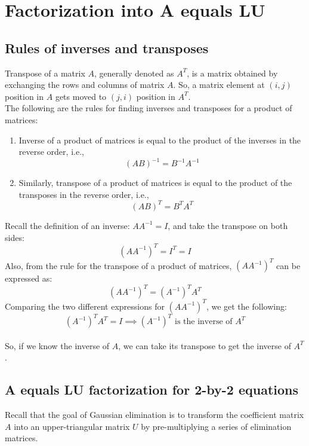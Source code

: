 \documentclass[../main.tex]{subfiles}
\begin{document}

\section{Factorization into A equals LU}


\subsection{Rules of inverses and transposes}
Transpose of a matrix $A$, generally denoted as $A^{T}$, is a matrix obtained by exchanging the rows and columns of matrix $A$. So, a matrix element at $(i, j)$ position in $A$ gets moved to $(j, i)$ position in $A^{T}$. \\

The following are the rules for finding inverses and transposes for a product of matrices:
\begin{enumerate}
    \item Inverse of a product of matrices is equal to the product of the inverses in the reverse order, i.e.,
          \[(AB)^{-1} = B^{-1}A^{-1}\]
    \item Similarly, transpose of a product of matrices is equal to the product of the transposes in the reverse order, i.e.,
          \[(AB)^{T} = B^{T}A^{T}\]
\end{enumerate}
Recall the definition of an inverse: $AA^{-1} = I$, and take the transpose on both sides:
\[
    (AA^{-1})^{T} = I^{T} = I
\]
Also, from the rule for the transpose of a product of matrices, $(AA^{-1})^{T}$ can be expressed as:
\[
    (AA^{-1})^{T} = (A^{-1})^{T}A^{T}
\]
Comparing the two different expressions for $(AA^{-1})^T$, we get the following:
\[
    (A^{-1})^{T}A^{T} = I \implies \text{$(A^{-1})^{T}$ is the inverse of $A^{T}$}
\]
\\
So, if we know the inverse of $A$, we can take its transpose to get the inverse of $A^{T}$.



\subsection{A equals LU factorization for 2-by-2 equations}
Recall that the  goal of Gaussian elimination is to transform the coefficient matrix $A$ into an upper-triangular matrix $U$ by pre-multiplying a series of elimination matrices. \\
\end{document}
